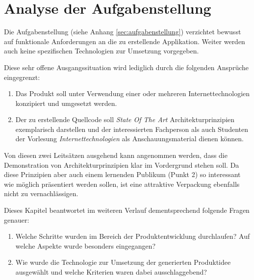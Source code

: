 \chapter{Analyse der Aufgabenstellung}

Die Aufgabenstellung (siehe Anhang \ref{sec:aufgabenstellung}) verzichtet bewusst auf funktionale Anforderungen an die zu erstellende Applikation. Weiter werden auch keine spezifischen Technologien zur Umsetzung vorgegeben.

Diese sehr offene Ausgangssituation wird lediglich durch die folgenden Ansprüche eingegrenzt:

\begin{enumerate}
	\item Das Produkt soll unter Verwendung einer oder mehreren Internettechnologien konzipiert und umgesetzt werden.
	\item Der zu erstellende Quellcode soll \emph{State Of The Art} Architekturprinzipien \cite{ROCA} exemplarisch darstellen und der interessierten Fachperson als auch Studenten der Vorlesung \emph{Internettechnologien} als Anschauungsmaterial dienen können.
\end{enumerate}

Von diesen zwei Leitsätzen ausgehend kann angenommen werden, dass die Demonstration von Architekturprinzipien klar im Vordergrund stehen soll. Da diese Prinzipien aber auch einem lernenden Publikum (Punkt 2) so interessant wie möglich präsentiert werden sollen, ist eine attraktive Verpackung ebenfalls nicht zu vernachlässigen.

Dieses Kapitel beantwortet im weiteren Verlauf dementsprechend folgende Fragen genauer:

\begin{enumerate}
	\item Welche Schritte wurden im Bereich der Produktentwicklung durchlaufen? Auf welche Aspekte wurde besonders eingegangen?
	\item Wie wurde die Technologie zur Umsetzung der generierten Produktidee ausgewählt und welche Kriterien waren dabei ausschlaggebend?
\end{enumerate}



